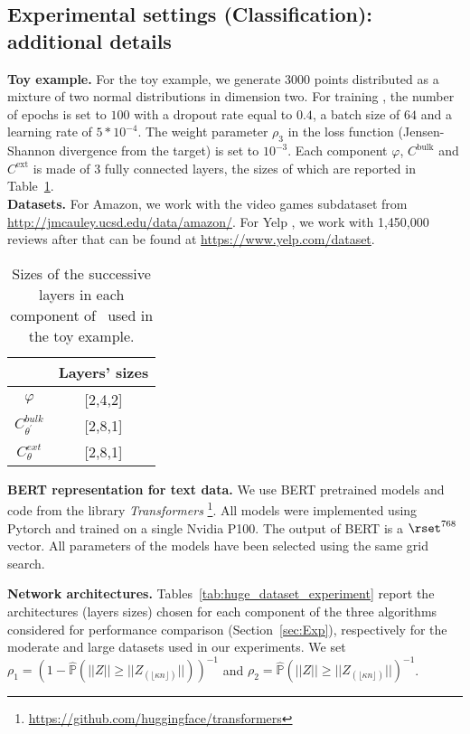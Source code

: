 \subsection{Experimental settings (Classification): additional details}
\label{additional_exp_classif}

\textbf{Toy example. } For the toy example, we generate $3000$ points distributed as a mixture of two normal distributions in dimension two. For training \HTalgo, the number of epochs is set to $100$ with a  dropout rate equal to $0.4$, a  batch size of $64$ and a learning rate of $5*10^{-4}$. The weight parameter $\rho_3$ in the loss function (Jensen-Shannon divergence from the target) is set to $10^{-3}$. 
Each component $\varphi$, $C^{\text{bulk}}$ and $C^{\text{ext}} $ is made of $3$ fully connected layers, the sizes of which are reported in  Table~\ref{tab:toys_dataset_experiment}. \\
\textbf{Datasets.} For Amazon, we
  work with the video games subdataset from
  \url{http://jmcauley.ucsd.edu/data/amazon/}. For Yelp \cite{yelp_1,yelp_2}, we work with 1,450,000 reviews after that can be found at
  \url{https://www.yelp.com/dataset}. 




\begin{table}[ht]
    \centering
    \begin{tabular}{c|c}\hline
&     Layers' sizes \\ \hline
$\varphi$  & [2,4,2]   \\
$C_{\theta^\prime}^{bulk}$ &  [2,8,1]   \\
$C_{\theta}^{ext}$ &  [2,8,1] \\
\end{tabular}
    \caption{ Sizes of the successive layers in each component of \HTalgo\ used in the toy example. }
    \label{tab:toys_dataset_experiment}
\end{table}

\textbf{BERT representation for text data.} 
We use BERT pretrained models and code from the library \textit{Transformers} \footnote{\url{https://github.com/huggingface/transformers}}. All models were implemented using Pytorch and trained on a single Nvidia P100. The output of BERT is a $\rset^{768}$ vector. All parameters of the models have been selected using the same grid search. 

\textbf{Network architectures.}
Tables~\ref{tab:huge_dataset_experiment} report the architectures (layers sizes) chosen for each component of the three algorithms considered for performance comparison (Section~\ref{sec:Exp}), respectively for the moderate and large datasets used in our experiments.  We set $\rho_1 = (1 -  \hat{\mathbb{P}}(||Z|| \geq ||Z_{(\lfloor \kappa n \rfloor)}||))^{-1}$ and $\rho_2=\hat{\mathbb{P}}(||Z||\geq ||Z_{(\lfloor \kappa n \rfloor)}||)^{-1}$.




